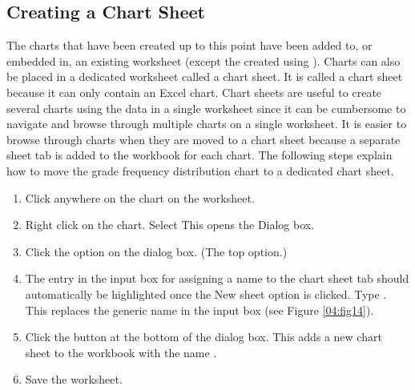 \subsection{Creating a Chart Sheet}

The charts that have been created up to this point have been added to, or embedded in, an existing worksheet (except the  created using ). Charts can also be placed in a dedicated worksheet called a chart sheet. It is called a chart sheet because it can only contain an Excel chart. Chart sheets are useful to create several charts using the data in a single worksheet since it can be cumbersome to navigate and browse through multiple charts on a single worksheet. It is easier to browse through charts when they are moved to a chart sheet because a separate sheet tab is added to the workbook for each chart. The following steps explain how to move the grade frequency distribution chart to a dedicated chart sheet.

\begin{enumerate}
	\item Click anywhere on the  chart on the  worksheet.
	\item Right click on the chart. Select  This opens the  Dialog box.
	\item Click the  option on the  dialog box. (The top option.)
	\item The entry in the input box for assigning a name to the chart sheet tab should automatically be highlighted once the New sheet option is clicked. Type . This replaces the generic name in the input box (see Figure \ref{04:fig14}).
	\item Click the  button at the bottom of the  dialog box. This adds a new chart sheet to the workbook with the name .
	\item Save the worksheet.
\end{enumerate}

